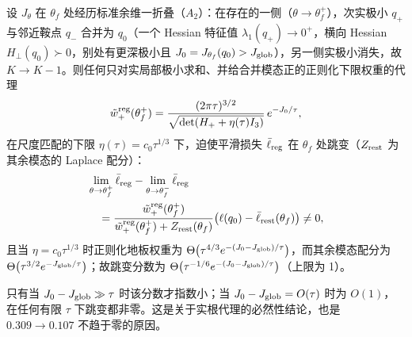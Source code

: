 \begin{proposition}[实根代理必然跳变]\label{prop:q5b}
设 $J_\theta$ 在 $\theta_f$ 处经历标准余维一折叠（$A_2$）：在存在的一侧（$\theta\to\theta_f^+$），次实极小 $q_+$ 与邻近鞍点 $q_-$ 合并为 $q_0$（一个 Hessian 特征值 $\lambda_1(q_+)\to0^+$，横向 Hessian $H_\perp(q_0)\succ0$，别处有更深极小且 $J_0=J_{\theta_f}(q_0)>J_{\rm glob}$），另一侧实极小消失，故 $K\to K-1$。则任何只对实局部极小求和、并给合并模态正的正则化下限权重的代理
\begin{equation}
\tilde w_+^{\rm reg}(\theta_f^+)=\frac{(2\pi\tau)^{3/2}}{\sqrt{\det(H_++\eta(\tau)I_3)}}\,e^{-J_0/\tau},
\label{eq:floorweight}
\end{equation}
在尺度匹配的下限 $\eta(\tau)=c_0\tau^{1/3}$ 下，迫使平滑损失 $\bar\ell_{\rm reg}$ 在 $\theta_f$ 处跳变（$Z_{\rm rest}$ 为其余模态的 Laplace 配分）：
\begin{equation}
\begin{split}
&\lim_{\theta\to\theta_f^+}\bar\ell_{\rm reg}-\lim_{\theta\to\theta_f^-}\bar\ell_{\rm reg}\\
&\quad=\frac{\tilde w_+^{\rm reg}(\theta_f^+)}{\tilde w_+^{\rm reg}(\theta_f^+)+Z_{\rm rest}(\theta_f)}\big(\ell(q_0)-\bar\ell_{\rm rest}(\theta_f)\big)\neq0,
\end{split}
\label{eq:jump}
\end{equation}
且当 $\eta=c_0\tau^{1/3}$ 时正则化地板权重为 $\Theta\big(\tau^{4/3}e^{-(J_0-J_{\rm glob})/\tau}\big)$，而其余模态配分为 $\Theta\big(\tau^{3/2}e^{-J_{\rm glob}/\tau}\big)$；故跳变分数为 $\Theta\big(\tau^{-1/6}e^{-(J_0-J_{\rm glob})/\tau}\big)$（上限为 1）。
\end{proposition}

只有当 $J_0-J_{\rm glob}\gg\tau$ 时该分数才指数小；当 $J_0-J_{\rm glob}=O(\tau)$ 时为 $O(1)$，在任何有限 $\tau$ 下跳变都非零。这是关于实根代理的必然性结论，也是 $0.309\to0.107$ 不趋于零的原因。

